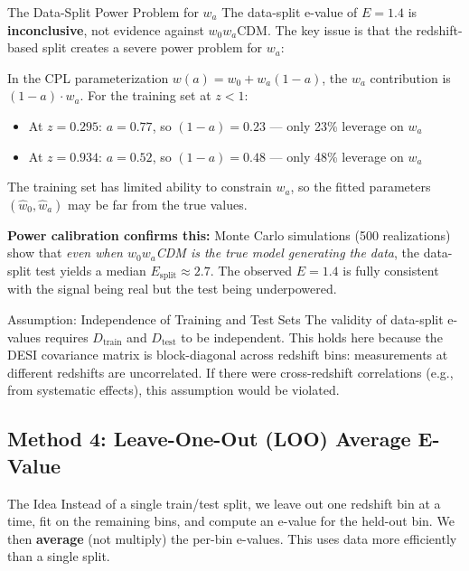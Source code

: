 \documentclass[11pt,a4paper]{article}
\begin{document}
\begin{warningbox}{The Data-Split Power Problem for $w_a$}
The data-split e-value of $E = 1.4$ is \textbf{inconclusive}, not evidence against $w_0w_a$CDM. The key issue is that the redshift-based split creates a severe power problem for $w_a$:

In the CPL parameterization $w(a) = w_0 + w_a(1-a)$, the $w_a$ contribution is $(1-a) \cdot w_a$. For the training set at $z < 1$:
\begin{itemize}
    \item At $z = 0.295$: $a = 0.77$, so $(1-a) = 0.23$ --- only 23\% leverage on $w_a$
    \item At $z = 0.934$: $a = 0.52$, so $(1-a) = 0.48$ --- only 48\% leverage on $w_a$
\end{itemize}
The training set has limited ability to constrain $w_a$, so the fitted parameters $(\hat{w}_0, \hat{w}_a)$ may be far from the true values.

\textbf{Power calibration confirms this:} Monte Carlo simulations (500 realizations) show that \textit{even when $w_0w_a$CDM is the true model generating the data}, the data-split test yields a median $E_{\text{split}} \approx 2.7$. The observed $E = 1.4$ is fully consistent with the signal being real but the test being underpowered.
\end{warningbox}

\begin{warningbox}{Assumption: Independence of Training and Test Sets}
The validity of data-split e-values requires $D_{\text{train}}$ and $D_{\text{test}}$ to be independent. This holds here because the DESI covariance matrix is block-diagonal across redshift bins: measurements at different redshifts are uncorrelated. If there were cross-redshift correlations (e.g., from systematic effects), this assumption would be violated.
\end{warningbox}


\subsection{Method 4: Leave-One-Out (LOO) Average E-Value}
\label{sec:loo}

\begin{conceptbox}{The Idea}
Instead of a single train/test split, we leave out one redshift bin at a time, fit on the remaining bins, and compute an e-value for the held-out bin. We then \textbf{average} (not multiply) the per-bin e-values. This uses data more efficiently than a single split.
\end{conceptbox}
\end{document}
